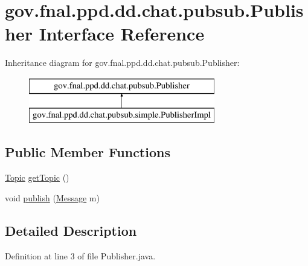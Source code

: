 \hypertarget{interfacegov_1_1fnal_1_1ppd_1_1dd_1_1chat_1_1pubsub_1_1Publisher}{\section{gov.\-fnal.\-ppd.\-dd.\-chat.\-pubsub.\-Publisher Interface Reference}
\label{interfacegov_1_1fnal_1_1ppd_1_1dd_1_1chat_1_1pubsub_1_1Publisher}
}
Inheritance diagram for gov.\-fnal.\-ppd.\-dd.\-chat.\-pubsub.\-Publisher\-:\begin{figure}[H]
\begin{center}
\leavevmode
\includegraphics[height=2.000000cm]{interfacegov_1_1fnal_1_1ppd_1_1dd_1_1chat_1_1pubsub_1_1Publisher}
\end{center}
\end{figure}
\subsection*{Public Member Functions}
\begin{DoxyCompactItemize}
\item 
\hyperlink{classgov_1_1fnal_1_1ppd_1_1dd_1_1chat_1_1pubsub_1_1Topic}{Topic} \hyperlink{interfacegov_1_1fnal_1_1ppd_1_1dd_1_1chat_1_1pubsub_1_1Publisher_a1cc57c0af81aa79983a2279a3e994239}{get\-Topic} ()
\item 
void \hyperlink{interfacegov_1_1fnal_1_1ppd_1_1dd_1_1chat_1_1pubsub_1_1Publisher_a51c46e3fee04c1eb5a04b99a323d306b}{publish} (\hyperlink{interfacegov_1_1fnal_1_1ppd_1_1dd_1_1chat_1_1pubsub_1_1Message}{Message} m)
\end{DoxyCompactItemize}


\subsection{Detailed Description}


Definition at line 3 of file Publisher.\-java.



